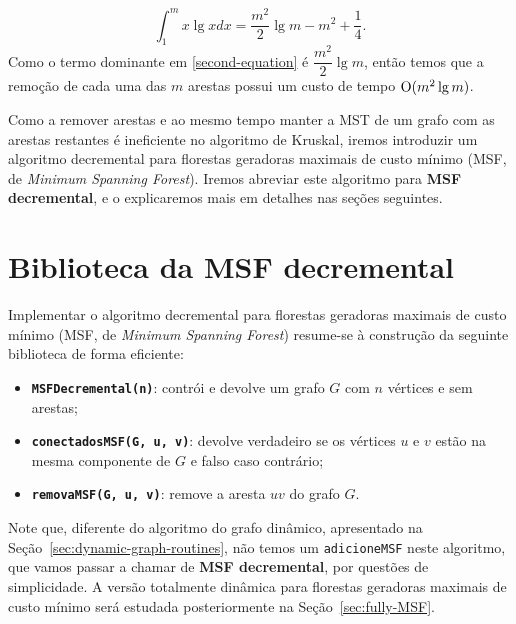 \begin{equation}
    \int_{1}^{m} x \lg x dx = \dfrac{m^2}{2}\lg m - m^2 + \dfrac{1}{4}.
    \label{second-equation}
\end{equation}
Como o termo dominante em \ref{second-equation} é $\dfrac{m^2}{2}\lg m$, então temos que a remoção de cada uma das $m$ arestas possui um custo de tempo $\mathrm{O}(m^2 \lg m)$. 

Como a remover arestas e ao mesmo tempo manter a MST de um grafo com as arestas restantes é ineficiente no algoritmo de Kruskal, iremos introduzir um algoritmo decremental para florestas geradoras maximais de custo mínimo (MSF, de \textit{Minimum Spanning Forest}). Iremos abreviar este algoritmo para \textbf{MSF decremental}, e o explicaremos mais em detalhes nas seções seguintes.


\section{Biblioteca da MSF decremental}
\label{sec:decremental-msf-library}

Implementar o algoritmo decremental para florestas geradoras maximais de custo mínimo (MSF, de \textit{Minimum Spanning Forest}) resume-se à construção da seguinte biblioteca de forma eficiente:

\begin{itemize}
    \item \texttt{\textbf{MSFDecremental(n)}}: contrói e devolve um grafo $G$ com $n$ vértices e sem arestas;
    \item \texttt{\textbf{conectadosMSF(G, u, v)}}: devolve verdadeiro se os vértices $u$ e $v$ estão na mesma componente de $G$ e falso caso contrário;
    \item \texttt{\textbf{removaMSF(G, u, v)}}: remove a aresta $uv$ do grafo $G$.
\end{itemize} 

Note que, diferente do algoritmo do grafo dinâmico, apresentado na Seção~\ref{sec:dynamic-graph-routines}, não temos um \texttt{adicioneMSF} neste algoritmo, que vamos passar a chamar de \textbf{MSF decremental}, por questões de simplicidade. A versão totalmente dinâmica para florestas geradoras maximais de custo mínimo será estudada posteriormente na Seção~\ref{sec:fully-MSF}.

